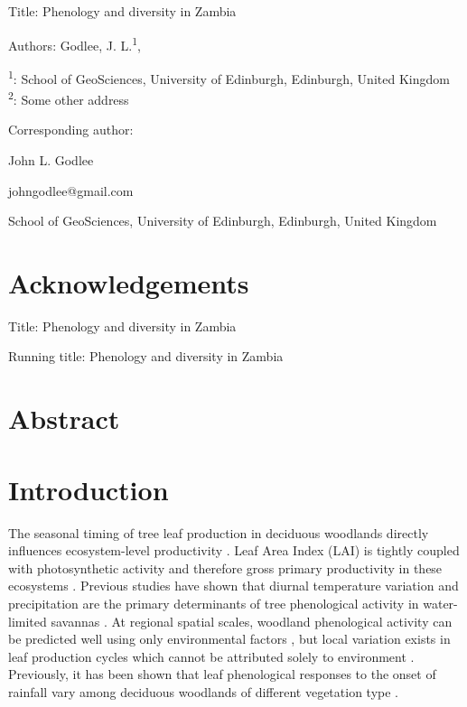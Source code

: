 \documentclass[11pt,a4paper]{article}
\newcommand{\titletext}{Phenology and diversity in Zambia}
\begin{document}
{\LARGE{Title: \titletext}}

\vspace{1cm}

Authors: Godlee, J. L.\textsuperscript{1}, 

\textsuperscript{1}: School of GeoSciences, University of Edinburgh, Edinburgh, United Kingdom \\
\textsuperscript{2}: Some other address

\vspace{1em}
Corresponding author:

John L. Godlee

johngodlee@gmail.com

School of GeoSciences, University of Edinburgh, Edinburgh, United Kingdom

\section{Acknowledgements}

\newpage{}


\LARGE{Title: \titletext}

\normalsize{Running title: \titletext}

\section{Abstract}

\section{Introduction}

The seasonal timing of tree leaf production in deciduous woodlands directly influences ecosystem-level productivity \citep{}. Leaf Area Index (LAI) is tightly coupled with photosynthetic activity and therefore gross primary productivity in these ecosystems \citep{}. Previous studies have shown that diurnal temperature variation and precipitation are the primary determinants of tree phenological activity in water-limited savannas \citep{}. At regional spatial scales, woodland phenological activity can be predicted well using only environmental factors \citep{}, but local variation exists in leaf production cycles which cannot be attributed solely to environment \citep{}. Previously, it has been shown that leaf phenological responses to the onset of rainfall vary among deciduous woodlands of different vegetation type \citep{}.
\end{document}
